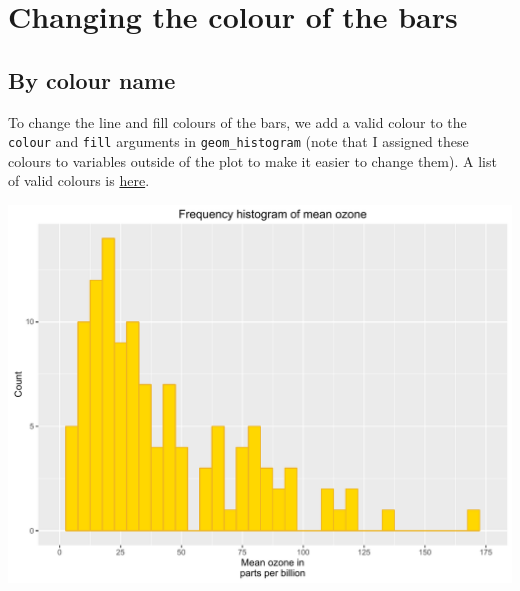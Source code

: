 \section{Changing the colour of the
bars}\label{changing-the-colour-of-the-bars}

\subsection{By colour name}\label{by-colour-name}

To change the line and fill colours of the bars, we add a valid colour
to the \texttt{colour} and \texttt{fill} arguments in
\texttt{geom\_histogram} (note that I assigned these colours to
variables outside of the plot to make it easier to change them). A list
of valid colours is
\href{http://www.stat.columbia.edu/~tzheng/files/Rcolor.pdf}{here}.

\begin{Shaded}
\begin{Highlighting}[]

\StringTok{ }\NormalTok{(} \StringTok{ }
\StringTok{      }\NormalTok{(}\NormalTok{(}  \NormalTok{,}
\StringTok{        }  
\StringTok{      }\NormalTok{(} \NormalTok{,}
\StringTok{        } \NormalTok{(}\NormalTok{, }\NormalTok{, }\NormalTok{),}
\StringTok{        }\NormalTok{(}\NormalTok{, }\NormalTok{)) +}
\StringTok{      }\NormalTok{(} \NormalTok{) +}
\StringTok{      }\NormalTok{(}\NormalTok{)}
\end{Highlighting}
\end{Shaded}

\begin{center}\includegraphics[width=0.55\linewidth]{figures/histogram_9-1} \end{center}

